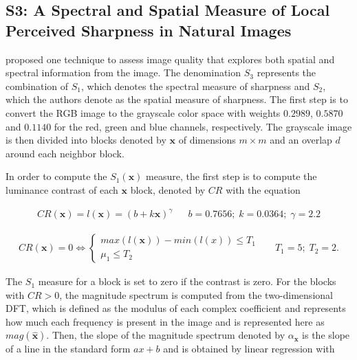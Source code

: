 \subsection{S3: A Spectral and Spatial Measure of Local Perceived Sharpness in Natural Images}

 proposed one technique to assess image quality that explores both spatial and spectral information from the image. The denomination $S_{3}$ represents the combination of $S_{1}$, which denotes the spectral measure of sharpness and $S_{2}$, which the authors denote as the spatial measure of sharpness. The first step is to convert the RGB image to the grayscale color space with weights $0.2989$, $0.5870$ and $0.1140$ for the red, green and blue channels, respectively. The grayscale image is then divided into blocks denoted by $\mathbf{x}$ of dimensions $m \times m$ and an overlap $d$ around each neighbor block.

In order to compute the $S_{1}(\mathbf{x})$ measure, the first step is to compute the luminance contrast of each $\mathbf{x}$ block, denoted by $CR$ with the equation

\begin{align}
\label{eqn:luminance_contrast}
CR(\mathbf{x}) = l(\mathbf{x}) = \left(b + k\mathbf{x}\right)^{\gamma}
&&
b = 0.7656;\; k = 0.0364;\; \gamma = 2.2
\end{align}

\begin{align*}
\label{eqn:contrast_constraints}
CR(\mathbf{x}) = 0 \iff
    \begin{cases}
        max(l(\mathbf{x})) - min(l(x)) \leq T_{1}\\
        \mu_{1} \leq T_{2}    
    \end{cases}
&&
T_{1} = 5;\; T_{2}= 2.
\end{align*}

\vspace{0.1in}

\noindent The $S_{1}$ measure for a block is set to zero if the contrast is zero. For the blocks with $CR > 0$, the magnitude spectrum is computed from the two-dimensional DFT, which is defined as the modulus of each complex coefficient and represents how much each frequency is present in the image and is represented here as $mag(\hat{\mathbf{x}})$. Then, the slope of the magnitude spectrum denoted by $\alpha_{\mathbf{x}}$ is the slope of a line in the standard form $ax + b$ and is obtained by linear regression with

